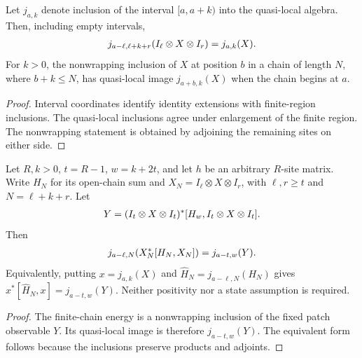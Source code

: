 \begin{lemma}
    \label{thm:quasi_local_bulk_inclusion}
    \leanok
    Let $j_{a,k}$ denote inclusion of the interval $[a,a+k)$ into the quasi-local
    algebra. Then, including empty intervals,
    \begin{align}
        j_{a-\ell,\ell+k+r}(I_\ell\otimes X\otimes I_r)=j_{a,k}(X).
        \notag
    \end{align}
    For $k>0$, the nonwrapping inclusion of $X$ at position $b$ in a chain of
    length $N$, where $b+k\leq N$, has quasi-local image $j_{a+b,k}(X)$ when the
    chain begins at $a$.
\end{lemma}
\begin{proof}\leanok
    Interval coordinates identify identity extensions with finite-region
    inclusions. The quasi-local inclusions agree under enlargement of the finite
    region. The nonwrapping statement is obtained by adjoining the remaining
    sites on either side.
\end{proof}

\begin{lemma}
    \label{thm:quasi_local_commutator_locality}
    \leanok
    Let $R,k>0$, $t=R-1$, $w=k+2t$, and let $h$ be an arbitrary $R$-site matrix.
    Write $H_N$ for its open-chain sum and $X_N=I_\ell\otimes X\otimes I_r$, with
    $\ell,r\geq t$ and $N=\ell+k+r$. Let
    \begin{align}
        Y=(I_t\otimes X\otimes I_t)^*
        [H_w,I_t\otimes X\otimes I_t].
        \notag
    \end{align}
    Then
    \begin{align}
        j_{a-\ell,N}(X_N^*[H_N,X_N])=j_{a-t,w}(Y).
        \notag
    \end{align}
    Equivalently, putting $x=j_{a,k}(X)$ and
    $\widehat H_N=j_{a-\ell,N}(H_N)$ gives
    $x^*[\widehat H_N,x]=j_{a-t,w}(Y)$.
    Neither positivity nor a state assumption is required.
\end{lemma}
\begin{proof}\leanok
    The finite-chain energy is a nonwrapping inclusion of the fixed patch
    observable $Y$. Its quasi-local image is therefore $j_{a-t,w}(Y)$.
    The equivalent form follows because the inclusions preserve products and
    adjoints.
\end{proof}

